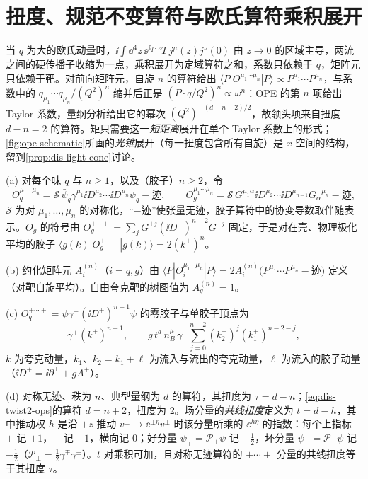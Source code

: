 \section{扭度、规范不变算符与欧氏算符乘积展开}\label{sec:dis-ope}

当 $q$ 为大的欧氏动量时，$\ii\int\dd^4z\,\ee^{\ii q\cdot z}T\,j^\mu(z)j^\nu(0)$ 由 $z\to0$ 的区域主导，两流之间的硬传播子收缩为一点，乘积展开为定域算符之和，系数只依赖于 $q$，矩阵元只依赖于靶。对前向矩阵元，自旋 $n$ 的算符给出 $\langle P|O^{\mu_1\cdots\mu_n}|P\rangle\propto P^{\mu_1}\cdots P^{\mu_n}$，与系数中的 $q_{\mu_1}\cdots q_{\mu_n}/(Q^2)^n$ 缩并后正是 $(P\cdot q/Q^2)^n\propto\omega^n$：OPE 的第 $n$ 项给出 Taylor 系数，量纲分析给出它的幂次 $(Q^2)^{-(d-n-2)/2}$，故领头项来自扭度 $d-n=2$ 的算符。矩只需要这一\emph{短距离}展开在单个 Taylor 系数上的形式；\cref{fig:ope-schematic}所画的\emph{光锥}展开（每一扭度包含所有自旋）是 $x$ 空间的结构，留到\cref{prop:dis-light-cone}讨论。


\begin{definition}[扭度与扭度 2 算符]\label{def:dis-twist}
(a) 对每个味 $q$ 与 $n\ge1$，以及（胶子）$n\ge2$，令
\begin{equation}\label{eq:dis-twist2-ops}
O_q^{\mu_1\cdots\mu_n}=\mathcal S\,\bar\psi_q\gamma^{\mu_1}\ii D^{\mu_2}\cdots\ii D^{\mu_n}\psi_q-\text{迹},\qquad
O_g^{\mu_1\cdots\mu_n}=\mathcal S\,G^{\mu_1\alpha}\ii D^{\mu_2}\cdots\ii D^{\mu_{n-1}}G_\alpha{}^{\mu_n}-\text{迹},
\end{equation}
$\mathcal S$ 为对 $\mu_1,\dots,\mu_n$ 的对称化，“$-$迹”使张量无迹，胶子算符中的协变导数取伴随表示。$O_g$ 的符号由 $O_g^{+\cdots+}=\sum_jG^{+j}(\ii D^+)^{n-2}G^{+j}$ 固定，于是对在壳、物理极化平均的胶子 $\langle g(k)|O_g^{+\cdots+}|g(k)\rangle=2(k^+)^n$。%
\par
(b) 约化矩阵元 $A^{(n)}_i$（$i=q,g$）由 $\langle P|O_i^{\mu_1\cdots\mu_n}|P\rangle=2A^{(n)}_i\big(P^{\mu_1}\cdots P^{\mu_n}-\text{迹}\big)$ 定义（对靶自旋平均）。自由夸克靶的树图值为 $A^{(n)}_q=1$。
\par
(c) $O_q^{+\cdots+}=\bar\psi\gamma^+(\ii D^+)^{n-1}\psi$ 的零胶子与单胶子顶点为
\begin{equation}\label{eq:dis-Oq-vertex}
\gamma^+(k^+)^{n-1},\qquad g\,t^a\,n_B^\mu\,\gamma^+\sum_{j=0}^{n-2}(k_2^+)^j(k_1^+)^{n-2-j},
\end{equation}
$k$ 为夸克动量，$k_1$、$k_2=k_1+\ell$ 为流入与流出的夸克动量，$\ell$ 为流入的胶子动量（$\ii D^+=\ii\partial^++gA^+$）。%
\par
(d) 对称无迹、秩为 $n$、典型量纲为 $d$ 的算符，其扭度为 $\tau=d-n$；\cref{eq:dis-twist2-ops}的算符 $d=n+2$，扭度为 2。场分量的\emph{共线扭度}定义为 $t=d-h$，其中推动权 $h$ 是沿 $+z$ 推动 $v^\pm\to\ee^{\pm\eta}v^\pm$ 时该分量所乘的 $\ee^{h\eta}$ 的指数：每个上指标 $+$ 记 $+1$，$-$ 记 $-1$，横向记 $0$；好分量 $\psi_+=\mathcal P_+\psi$ 记 $+\frac12$，坏分量 $\psi_-=\mathcal P_-\psi$ 记 $-\frac12$（$\mathcal P_\pm=\frac12\gamma^\mp\gamma^\pm$）。$t$ 对乘积可加，且对称无迹算符的 $+\cdots+$ 分量的共线扭度等于其扭度 $\tau$。
\end{definition}

